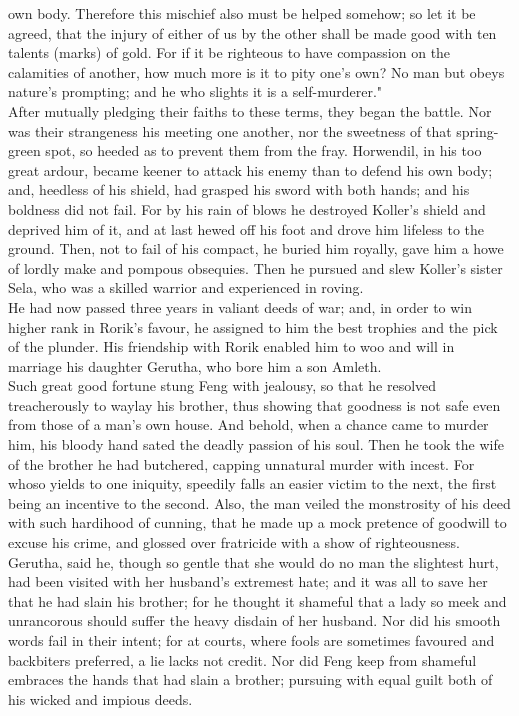 \documentclass[10pt,a4paper]{report}
\begin{document}
own body. Therefore this mischief also must be helped somehow; so let it be agreed, that the injury of either of us by the other shall be made good with ten talents (marks) of gold. For if it be righteous to have compassion on the calamities of another, how much more is it to pity one's own? No man but obeys nature's prompting; and he who slights it is a self-murderer."\\

After mutually pledging their faiths to these terms, they began the battle. Nor was their strangeness his meeting one another, nor the sweetness of that spring-green spot, so heeded as to prevent them from the fray. Horwendil, in his too great ardour, became keener to attack his enemy than to defend his own body; and, heedless of his shield, had grasped his sword with both hands; and his boldness did not fail. For by his rain of blows he destroyed Koller's shield and deprived him of it, and at last hewed off his foot and drove him lifeless to the ground. Then, not to fail of his compact, he buried him royally, gave him a howe of lordly make and pompous obsequies. Then he pursued and slew Koller's sister Sela, who was a skilled warrior and experienced in roving.\\

He had now passed three years in valiant deeds of war; and, in order to win higher rank in Rorik's favour, he assigned to him the best trophies and the pick of the plunder. His friendship with Rorik enabled him to woo and will in marriage his daughter Gerutha, who bore him a son Amleth.\\

Such great good fortune stung Feng with jealousy, so that he resolved treacherously to waylay his brother, thus showing that goodness is not safe even from those of a man's own house. And behold, when a chance came to murder him, his bloody hand sated the deadly passion of his soul. Then he took the wife of the brother he had butchered, capping unnatural murder with incest. For whoso yields to one iniquity, speedily falls an easier victim to the next, the first being an incentive to the second. Also, the man veiled the monstrosity of his deed with such hardihood of cunning, that he made up a mock pretence of goodwill to excuse his crime, and glossed over fratricide with a show of righteousness. Gerutha, said he, though so gentle that she would do no man the slightest hurt, had been visited with her husband's extremest hate; and it was all to save her that he had slain his brother; for he thought it shameful that a lady so meek and unrancorous should suffer the heavy disdain of her husband. Nor did his smooth words fail in their intent; for at courts, where fools are sometimes favoured and backbiters preferred, a lie lacks not credit. Nor did Feng keep from shameful embraces the hands that had slain a brother; pursuing with equal guilt both of his wicked and impious deeds.\\
\end{document}

